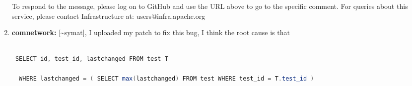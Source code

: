 \documentclass{report}%
\begin{document}
\begin{enumerate}
To respond to the message, please log on to GitHub and use the\newline%
URL above to go to the specific comment.\newline%
\newline%
For queries about this service, please contact Infrastructure at:\newline%
users@infra.apache.org\newline%
%
\item%
\textbf{comnetwork: }{[}\textasciitilde{}symat{]}, I uploaded my patch to fix this bug, I think the root cause is that\newline%
\begin{lstlisting}[language=java]

 SELECT id, test_id, lastchanged FROM test T

  WHERE lastchanged = ( SELECT max(lastchanged) FROM test WHERE test_id = T.test_id )


\end{lstlisting}
\end{enumerate}
\end{document}
